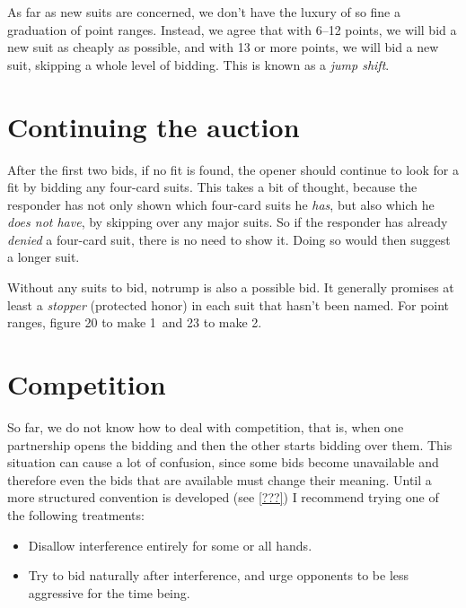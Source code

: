 \documentclass[oneside]{memoir}
\begin{document}
As far as new suits are concerned, we don't have the luxury of so fine a
graduation of point ranges.  Instead, we agree that with 6--12 points, we
will bid a new suit as cheaply as possible, and with 13 or more points,
we will bid a new suit, skipping a whole level of bidding.  This is known
as a \textit{jump shift}.

\section{Continuing the auction}
After the first two bids, if no fit is found, the opener should continue
to look for a fit by bidding any four-card suits.  This takes a bit of
thought, because the responder has not only shown which four-card suits
he \textit{has}, but also which he \textit{does not have}, by skipping over
any major suits.  So if the responder has already \textit{denied} a four-card
suit, there is no need to show it.  Doing so would then suggest a longer suit.

Without any suits to bid, notrump is also a possible bid.  It
generally promises at least a \textit{stopper} (protected honor) in
each suit that hasn't been named.  For point ranges, figure 20 to make 
1\NT\ and 23 to make 2\NT.

\section{Competition}
So far, we do not know how to deal with competition, that is, when one
partnership opens the bidding and then the other starts bidding over them.
This situation can cause a lot of confusion, since some bids become
unavailable and therefore even the bids that are available must change
their meaning.  Until a more structured convention is developed
(see \ref{???}) I recommend trying one of the following treatments:
\begin{itemize}
\item Disallow interference entirely for some or all hands.
\item Try to bid naturally after interference, and urge opponents to
  be less aggressive for the time being.
\end{itemize}
\end{document}

